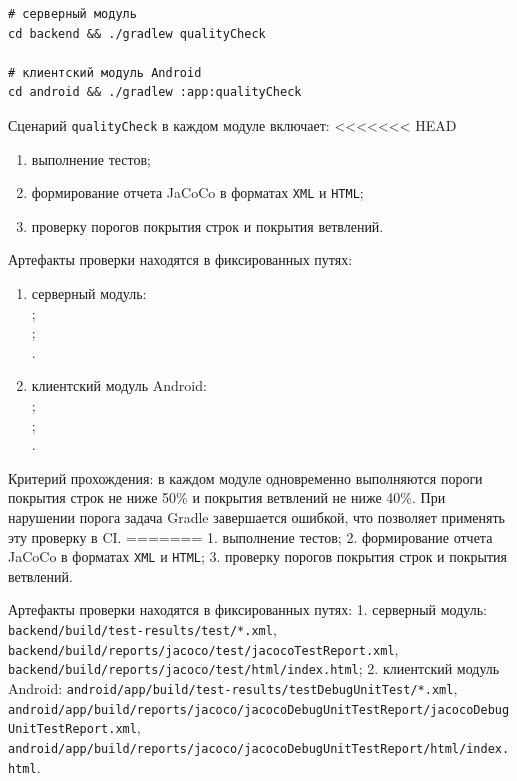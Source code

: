 \begin{verbatim}
# серверный модуль
cd backend && ./gradlew qualityCheck

# клиентский модуль Android
cd android && ./gradlew :app:qualityCheck
\end{verbatim}

Сценарий \texttt{qualityCheck} в каждом модуле включает:
<<<<<<< HEAD
\begin{enumerate}
    \item выполнение тестов;
    \item формирование отчета JaCoCo в форматах \texttt{XML} и \texttt{HTML};
    \item проверку порогов покрытия строк и покрытия ветвлений.
\end{enumerate}

Артефакты проверки находятся в фиксированных путях:
\begin{sloppypar}
\begin{enumerate}
    \item серверный модуль:\\
    ;\\
    ;\\
    .
    \item клиентский модуль Android:\\
    ;\\
    ;\\
    .
\end{enumerate}
\end{sloppypar}

Критерий прохождения: в каждом модуле одновременно выполняются пороги покрытия строк не ниже 50\% и покрытия ветвлений не ниже 40\%. При нарушении порога задача Gradle завершается ошибкой, что позволяет применять эту проверку в CI.
=======
1. выполнение тестов;
2. формирование отчета JaCoCo в форматах \texttt{XML} и \texttt{HTML};
3. проверку порогов покрытия строк и покрытия ветвлений.

Артефакты проверки находятся в фиксированных путях:
1. серверный модуль:
\texttt{backend/build/test-results/test/*.xml},
\texttt{backend/build/reports/jacoco/test/jacocoTestReport.xml},
\texttt{backend/build/reports/jacoco/test/html/index.html};
2. клиентский модуль Android:
\texttt{android/app/build/test-results/testDebugUnitTest/*.xml},
\texttt{android/app/build/reports/jacoco/jacocoDebugUnitTestReport/jacocoDebugUnitTestReport.xml},
\texttt{android/app/build/reports/jacoco/jacocoDebugUnitTestReport/html/index.html}.

